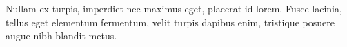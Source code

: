 \section*{}

Nullam ex turpis, imperdiet nec maximus eget, placerat id lorem. Fusce lacinia, tellus eget elementum fermentum, velit turpis dapibus enim, tristique posuere augue nibh blandit metus.